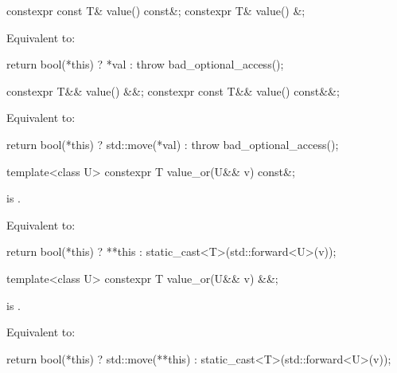 %
\begin{itemdecl}
constexpr const T& value() const&;
constexpr T& value() &;
\end{itemdecl}

\begin{itemdescr}
\pnum
\effects
Equivalent to:
\begin{codeblock}
return bool(*this) ? *val : throw bad_optional_access();
\end{codeblock}
\end{itemdescr}

%
\begin{itemdecl}
constexpr T&& value() &&;
constexpr const T&& value() const&&;
\end{itemdecl}

\begin{itemdescr}

\pnum
\effects
Equivalent to:
\begin{codeblock}
return bool(*this) ? std::move(*val) : throw bad_optional_access();
\end{codeblock}
\end{itemdescr}

%
\begin{itemdecl}
template<class U> constexpr T value_or(U&& v) const&;
\end{itemdecl}

\begin{itemdescr}
\pnum
\mandates
{} is .

\pnum
\effects
Equivalent to:
\begin{codeblock}
return bool(*this) ? **this : static_cast<T>(std::forward<U>(v));
\end{codeblock}
\end{itemdescr}

%
\begin{itemdecl}
template<class U> constexpr T value_or(U&& v) &&;
\end{itemdecl}

\begin{itemdescr}
\pnum
\mandates
{} is .

\pnum
\effects
Equivalent to:
\begin{codeblock}
return bool(*this) ? std::move(**this) : static_cast<T>(std::forward<U>(v));
\end{codeblock}
\end{itemdescr}


